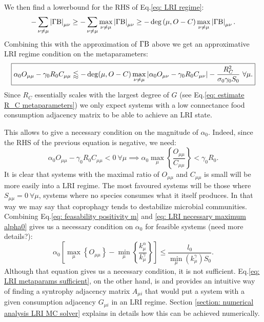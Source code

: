 \documentclass[12pt, titlepage]{report}
\begin{document}
We then find a lowerbound for the RHS of Eq.\eqref{eq: LRI regime}:
\begin{equation}
-\sum_{\nu\neq\mu}\left|{\Gamma\text{B}}\right|_{\mu\nu} \geq - \sum_{\nu \neq \mu} \max_{\nu \neq \mu} \left|{\Gamma\text{B}}\right|_{\mu\nu} \geq - \deg\left(\mu, O-C \right) \max_{\nu \neq \mu} \left|{\Gamma\text{B}}\right|_{\mu\nu}.
\end{equation}
Combining this with the approximation of $\Gamma\text{B}$ above we get an approximative LRI regime condition on the metaparameters:
\begin{equation}\boxed{
\alpha_0 O_{\mu \mu}-\gamma_0R_0 C_{\mu\mu} \lessapprox - \deg(\mu, O-C) \max_{\nu\neq\mu}\left|{\alpha_0 O_{\mu \nu}-\gamma_0 R_0 C_{\mu\nu}}\right|-\frac{R_C^2}{\sigma_0\gamma_0 S_0} \ \forall \mu.
}\label{eq: LRI metaparams sufficient}
\end{equation}
Since $R_C$ essentially scales with the largest degree of $G$ (see Eq.\ref{eq: estimate R_C metaparameters}) we only expect systems with a low connectance food consumption adjacency matrix to be able to achieve an LRI state.

This allows to give a necessary condition on the magnitude of $\alpha_0$. Indeed, since the RHS of the previous equation is negative, we need:
\begin{equation}
\alpha_0 O_{\mu \mu}-\gamma_0 R_0 C_{\mu\mu} < 0 \ \forall \mu \implies {\alpha_0 \max_\mu \left\{ \frac{O_{\mu\mu}}{C_{\mu\mu}}  \right\} < \gamma_0 R_0 .} \label{eq: LRI necessary maximum alpha0}
\end{equation}
It is clear that systems with the maximal ratio of $O_{\mu\mu}$ and $C_{\mu\mu}$ is small will be more easily into a LRI regime. The most favoured systems will be those where $S_{\mu\mu}=0 \ \forall \mu$, \ie systems where no species consumes what it itself produces. In that way we may say that coprophagy tends to destabilize microbial communities.
Combining Eq.\eqref{eq: feasability positivity m} and \eqref{eq: LRI necessary maximum alpha0} gives us a necessary condition on $\alpha_0$ for feasible systems (need more details?):
\begin{equation}
\boxed{
\alpha_0 \left[\max_\mu \left\{O_{\mu\mu}\right\}-\min_\mu \left\{ \frac{k^\alpha_\mu}{k^\gamma_\mu} \right\} \right] \leq \frac{l_0}{\min_\mu\left(k_\mu^\gamma\right)S_0}}.
\end{equation}
Although that equation gives us a necessary condition, it is not sufficient. Eq.\eqref{eq: LRI metaparams sufficient}, on the other hand, is and provides an intuitive way of finding a syntrophy adjacency matrix $A_{\mu i}$ that would put a system with a given consumption adjacency $G_{\mu i}$ in an LRI regime. Section \ref{section: numerical analysis LRI MC solver} explains in details how this can be achieved numerically.
\end{document}
